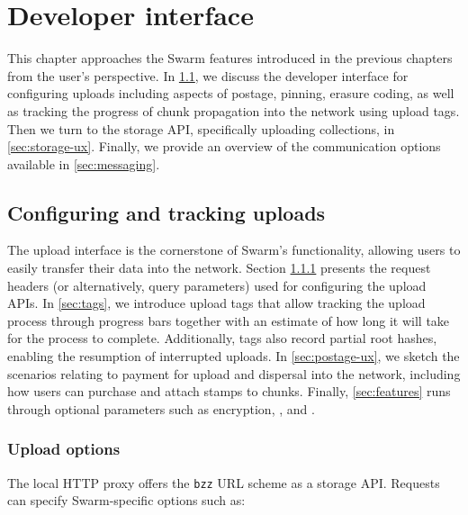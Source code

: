 \chapter{Developer interface}\label{sec:ux}

This chapter approaches the Swarm features introduced in the previous chapters from the user's perspective. In \ref{sec:upload}, we discuss the developer interface for configuring uploads including aspects of postage, pinning, erasure coding, as well as tracking the progress of chunk propagation into the network using upload tags. Then we turn to the storage API, specifically uploading collections, in \ref{sec:storage-ux}. Finally, we provide an overview of the communication options available in \ref{sec:messaging}.

\section{Configuring and tracking uploads \statusgreen}\label{sec:upload}

\green{}

The upload interface is the cornerstone of Swarm's functionality, allowing users to easily transfer their data into the network. Section \ref{sec:headers} presents the request headers (or alternatively, query parameters) used for configuring the upload APIs. In \ref{sec:tags}, we introduce upload tags that allow tracking the upload process through progress bars together with an estimate of how long it will take for the process to complete. Additionally, tags also record partial root hashes, enabling the resumption of interrupted uploads. In \ref{sec:postage-ux}, we sketch the scenarios relating to payment for upload and dispersal into the network, including how users can purchase and attach stamps to chunks. Finally, \ref{sec:features} runs through optional parameters such as encryption, , and .

\subsection{Upload options \statusgreen}\label{sec:headers}

The local HTTP proxy offers the \lstinline{bzz} URL scheme as a storage API. Requests can specify Swarm-specific options such as:

